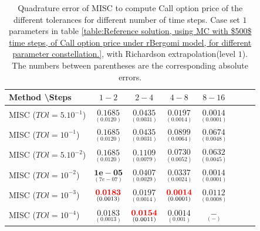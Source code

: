 \documentclass[11pt]{article}
\begin{document}
\begin{table}[!h]
	\centering
	\begin{tabular}{l*{6}{c}r}
		Method \textbackslash  Steps            & $1-2$ & $2-4$ & $4-8$ & $8-16$  \\
		\hline
		MISC ($TOl=5.10^{-1}$)  & $\underset{(  0.0120)}{\mathbf{   0.1685}}$ & $\underset{(0.0031)}{\mathbf{0.0435}}$ & $\underset{(0.0014
			)}{\mathbf{ 0.0197}}$ & $\underset{(0.0001)}{\mathbf{0.0014}}$ \\
		MISC ($TOl=10^{-1}$)  & $\underset{(  0.0120)}{\mathbf{   0.1685}}$ & $\underset{(0.0031)}{\mathbf{0.0435}}$ & $\underset{(0.0064)}{\mathbf{0.0899}}$ & $\underset{(0.0048)}{\mathbf{0.0674}}$  \\
		MISC ($TOl=5.10^{-2}$)  & $\underset{(  0.0120)}{\mathbf{   0.1685}}$ & $\underset{(0.0079)}{\mathbf{0.1109}}$ & $\underset{(0.0052)}{\mathbf{0.0730}}$ & $\underset{(0.0045)}{\mathbf{0.0632}}$  \\
		MISC ($TOl=10^{-2}$)  & $\underset{(7e-07)}{\mathbf{1e-05}}$ &    $\underset{(0.0029)}{\mathbf{0.0407}}$ & $\underset{(0.0024  )}{\mathbf{0.0337}}$ & $\underset{(0.0001)}{\mathbf{0.0014}}$  \\
		MISC ($TOl=10^{-3}$)  & $\underset{(0.0013)}{\mathbf{
				{\color{red}0.0183}}}$ &    $\underset{(0.0014
			)}{\mathbf{0.0197}}$ & $\underset{(0.0001)}{\mathbf{ {\color{red}0.0014}
		}}$ & $\underset{(0.0008)}{\mathbf{0.0112}}$  \\
		
		MISC ($TOl=10^{-4}$)  & $\underset{(0.0013)}{\mathbf{
				0.0183}}$ &    $\underset{(0.0011
			
			)}{\mathbf{\red{0.0154}}}$ & $\underset{(0.001)}{\mathbf{   0.0014
		}}$ & $\underset{(-)}{\mathbf{-}}$  \\
		\hline
	\end{tabular}
	\caption{Quadrature error of MISC to compute Call option price of the different tolerances for different number of time steps. Case set $1$ parameters in table \ref{table:Reference solution, using MC with $500$ time steps, of Call option price under rBergomi model, for different parameter constellation.}, with Richardson extrapolation(level $1$). The numbers between parentheses are the corresponding absolute errors.}
	\label{Quadrature error of MISC to compute Call option price of the different tolerances for different number of time steps. Case set $1$ parameters, with Richardson extrapolation(level $1$). The numbers between parentheses are the corresponding absolute errors.}
\end{table}
\end{document}
